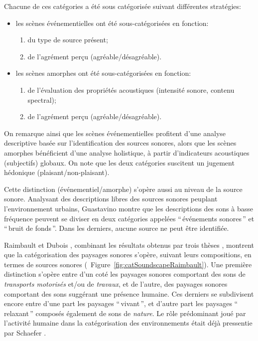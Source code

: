 Chacune de ces catégories a été sous catégorisée suivant différentes stratégies:

\begin{itemize}
\item les scènes événementielles ont été sous-catégorisées en fonction:
\begin{enumerate}
\item du type de source présent;
\item de l'agrément perçu (agréable/désagréable).
\end{enumerate}
\item les scènes amorphes ont été sous-catégorisées en fonction:
\begin{enumerate}
\item de l'évaluation des propriétés acoustiques (intensité sonore, contenu spectral);
\item de l'agrément perçu (agréable/désagréable).
\end{enumerate}
\end{itemize}

On remarque ainsi que les scènes événementielles profitent d'une analyse descriptive basée sur l'identification des sources sonores, alors que les scènes amorphes bénéficient d'une analyse holistique, à partir d'indicateurs acoustiques (subjectifs) globaux. On note que les deux catégories suscitent un jugement hédonique (plaisant/non-plaisant).

Cette distinction (événementiel/amorphe) s'opère aussi au niveau de la source sonore. Analysant des descriptions libres des sources sonores peuplant l’environnement urbains, Guastavino montre que les descriptions des sons à basse fréquence peuvent se diviser en deux catégories appelées ``\,événements sonores\,'' et ``\,bruit de fonds\,''. Dans les derniers, aucune source ne peut être identifiée.

Raimbault et Dubois \citep{raimbault2005urban}, combinant les résultats obtenus par trois thèses \citep{maffiolo_caracterisation_1999, raimbault2002simulation, guastavino_etude_2003}, montrent que la catégorisation des paysages sonores s'opère, suivant leurs compositions, en termes de sources sonores (\cf~Figure~\ref{fig:catSoundscapeRaimbault}). Une première distinction s'opère entre d'un coté les paysages sonores comportant des sons de \emph{transports motorisés} et/ou de \emph{travaux}, et  de l'autre, des paysages sonores comportant des sons suggérant une présence humaine. Ces derniers se subdivisent encore entre d'une part les paysages ``\,vivant\,'', et d'autre part les paysages ``\,relaxant\,'' composés également de sons de \emph{nature}. Le rôle prédominant joué par l'activité humaine dans la catégorisation des environnements était déjà pressentie par  Schaefer \citep{schafer1977tuning}.

